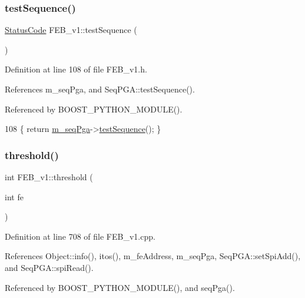 \subsubsection{\texorpdfstring{test\+Sequence()}{testSequence()}}
{\footnotesize\ttfamily \hyperlink{classStatusCode}{Status\+Code} F\+E\+B\+\_\+v1\+::test\+Sequence (\begin{DoxyParamCaption}{ }\end{DoxyParamCaption})\hspace{0.3cm}{\ttfamily [inline]}}



Definition at line 108 of file F\+E\+B\+\_\+v1.\+h.



References m\+\_\+seq\+Pga, and Seq\+P\+G\+A\+::test\+Sequence().



Referenced by B\+O\+O\+S\+T\+\_\+\+P\+Y\+T\+H\+O\+N\+\_\+\+M\+O\+D\+U\+L\+E().


\begin{DoxyCode}
108 \{ \textcolor{keywordflow}{return} \hyperlink{classFEB__v1_a6c7804ac86796f233a8393043adf2e77}{m\_seqPga}->\hyperlink{classSeqPGA_a299f2826e5edba5636f0f41233683156}{testSequence}(); \}
\end{DoxyCode}
\mbox{\label{classFEB__v1_a71e54700c59857844905c879e4b3d4fd}} 
\subsubsection{\texorpdfstring{threshold()}{threshold()}}
{\footnotesize\ttfamily int F\+E\+B\+\_\+v1\+::threshold (\begin{DoxyParamCaption}\item[{int}]{fe }\end{DoxyParamCaption})}



Definition at line 708 of file F\+E\+B\+\_\+v1.\+cpp.



References Object\+::info(), itos(), m\+\_\+fe\+Address, m\+\_\+seq\+Pga, Seq\+P\+G\+A\+::set\+Spi\+Add(), and Seq\+P\+G\+A\+::spi\+Read().



Referenced by B\+O\+O\+S\+T\+\_\+\+P\+Y\+T\+H\+O\+N\+\_\+\+M\+O\+D\+U\+L\+E(), and seq\+Pga().


